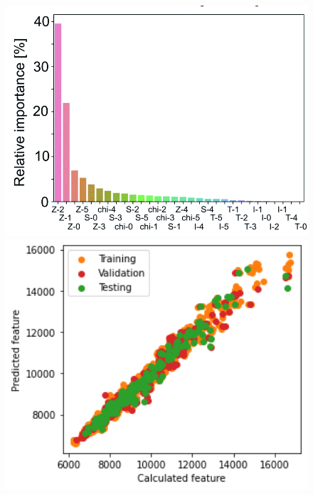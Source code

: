 \begin{figure}[!htb]
      \includegraphics[width=1.0\textwidth]{figures/regression/fourier/importance_map.png}
    \endminipage\hfill
      \includegraphics[width=1.0\textwidth]{figures/regression/fourier/transfer/scatterZ2.png}
    \endminipage

\end{figure}
